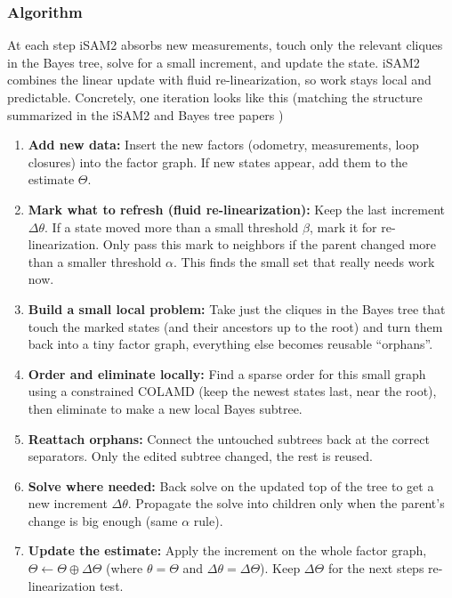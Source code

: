 \subsubsection{Algorithm}
At each step iSAM2 absorbs new measurements, touch only the relevant cliques in the Bayes tree, solve for a small increment, and update the state. iSAM2 combines the linear update with fluid re-linearization, so work stays local and predictable. Concretely, one iteration looks like this (matching the structure summarized in the iSAM2 and Bayes tree papers \cite{iSAM2_paper,Bayes_tree_for_SLAM_paper})
\begin{enumerate}
    \item \textbf{Add new data:} Insert the new factors (odometry, measurements, loop closures) into the factor graph. If new states appear, add them to the estimate $\Theta$.

    \item \textbf{Mark what to refresh (fluid re-linearization):} Keep the last increment $\Delta\theta$. If a state moved more than a small threshold $\beta$, mark it for re-linearization. Only pass this mark to neighbors if the parent changed more than a smaller threshold $\alpha$. This finds the small set that really needs work now.

    \item \textbf{Build a small local problem:} Take just the cliques in the Bayes tree that touch the marked states (and their ancestors up to the root) and turn them back into a tiny factor graph, everything else becomes reusable ``orphans''.

    \item \textbf{Order and eliminate locally:} Find a sparse order for this small graph using a constrained COLAMD (keep the newest states last, near the root), then eliminate to make a new local Bayes subtree.

    \item \textbf{Reattach orphans:} Connect the untouched subtrees back at the correct separators. Only the edited subtree changed, the rest is reused.

    \item \textbf{Solve where needed:} Back solve on the updated top of the tree to get a new increment $\Delta\theta$. Propagate the solve into children only when the parent's change is big enough (same $\alpha$ rule).

    \item \textbf{Update the estimate:} Apply the increment on the whole factor graph, $\Theta \leftarrow \Theta \oplus \Delta\Theta$ (where $\theta = \Theta$ and $\Delta\theta = \Delta\Theta$). Keep $\Delta\Theta$ for the next steps re-linearization test.


\end{enumerate}
